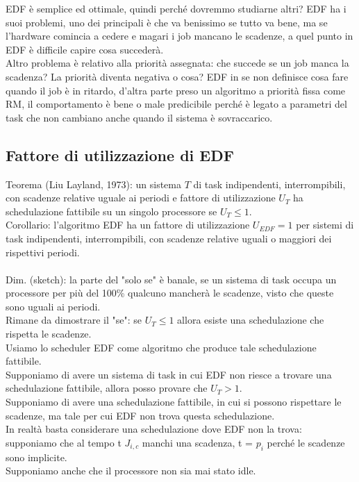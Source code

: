\documentclass[12pt, oneside]{extbook}
\begin{document}
EDF è semplice ed ottimale, quindi perché dovremmo studiarne altri? EDF ha i suoi problemi, uno dei principali è che va benissimo se tutto va bene, ma se l'hardware comincia a cedere e magari i job mancano le scadenze, a quel punto in EDF è difficile capire cosa succederà.\\
Altro problema è relativo alla priorità assegnata: che succede se un job manca la scadenza? La priorità diventa negativa o cosa? EDF in se non definisce cosa fare quando il job è in ritardo, d'altra parte preso un algoritmo a priorità fissa come RM, il comportamento è bene o male predicibile perché è legato a parametri del task che non cambiano anche quando il sistema è sovraccarico.

\subsection{Fattore di utilizzazione di EDF}
Teorema (Liu Layland, 1973): un sistema $T$ di task indipendenti, interrompibili, con scadenze relative uguale ai periodi e fattore di utilizzazione $U_T$ ha schedulazione fattibile su un singolo processore se $U_T \leq 1$.\\
Corollario: l'algoritmo EDF ha un fattore di utilizzazione $U_{EDF} = 1$ per sistemi di task indipendenti, interrompibili, con scadenze relative uguali o maggiori dei rispettivi periodi.\\\\
Dim. (sketch): la parte del "solo se" è banale, se un sistema di task occupa un processore per più del 100\% qualcuno mancherà le scadenze, visto che queste sono uguali ai periodi.\\
Rimane da dimostrare il "se": se $U_T \leq 1$ allora esiste una schedulazione che rispetta le scadenze.\\
Usiamo lo scheduler EDF come algoritmo che produce tale schedulazione fattibile.\\
Supponiamo di avere un sistema di task in cui EDF non riesce a trovare una schedulazione fattibile, allora posso provare che $U_T > 1$.\\Supponiamo di avere una schedulazione fattibile, in cui si possono rispettare le scadenze, ma tale per cui EDF non trova questa schedulazione.\\
In realtà basta considerare una schedulazione dove EDF non la trova: supponiamo che al tempo t $J_{i,c}$ manchi una scadenza, t = $p_i$ perché le scadenze sono implicite.\\
Supponiamo anche che il processore non sia mai stato idle.
\end{document}
